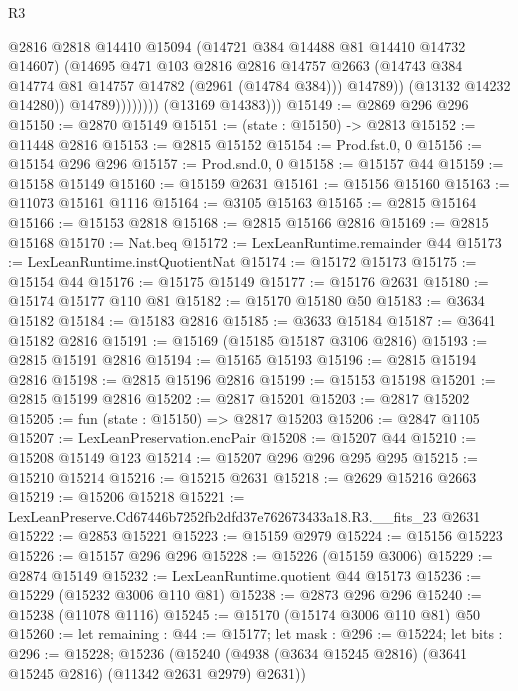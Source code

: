 \begin{lexlean}{R3}
\begin{coremodule}
                            @2816
                            @2818
                            @14410
                            @15094
                            (@14721 @384 @14488 @81 @14410 @14732 @14607)
                            (@14695
                              @471
                              @103
                              @2816
                              @2816
                              @14757
                              @2663
                              (@14743 @384 @14774 @81 @14757 @14782 (@2961 (@14784 @384)))
                              @14789))
                          (@13132 @14232 @14280))
                        @14789))))))))
        (@13169 @14383)))
@15149 := @2869 @296 @296
@15150 := @2870 @15149
@15151 := (state : @15150) -> @2813
@15152 := @11448 @2816
@15153 := @2815 @15152
@15154 := Prod.fst.{0, 0}
@15156 := @15154 @296 @296
@15157 := Prod.snd.{0, 0}
@15158 := @15157 @44
@15159 := @15158 @15149
@15160 := @15159 @2631
@15161 := @15156 @15160
@15163 := @11073 @15161 @1116
@15164 := @3105 @15163
@15165 := @2815 @15164
@15166 := @15153 @2818
@15168 := @2815 @15166 @2816
@15169 := @2815 @15168
@15170 := Nat.beq
@15172 := LexLeanRuntime.remainder @44
@15173 := LexLeanRuntime.instQuotientNat
@15174 := @15172 @15173
@15175 := @15154 @44
@15176 := @15175 @15149
@15177 := @15176 @2631
@15180 := @15174 @15177 @110 @81
@15182 := @15170 @15180 @50
@15183 := @3634 @15182
@15184 := @15183 @2816
@15185 := @3633 @15184
@15187 := @3641 @15182 @2816
@15191 := @15169 (@15185 @15187 @3106 @2816)
@15193 := @2815 @15191 @2816
@15194 := @15165 @15193
@15196 := @2815 @15194 @2816
@15198 := @2815 @15196 @2816
@15199 := @15153 @15198
@15201 := @2815 @15199 @2816
@15202 := @2817 @15201
@15203 := @2817 @15202
@15205 := fun (state : @15150) => @2817 @15203
@15206 := @2847 @1105
@15207 := LexLeanPreservation.encPair
@15208 := @15207 @44
@15210 := @15208 @15149 @123
@15214 := @15207 @296 @296 @295 @295
@15215 := @15210 @15214
@15216 := @15215 @2631
@15218 := @2629 @15216 @2663
@15219 := @15206 @15218
@15221 := LexLeanPreserve.Cd67446b7252fb2dfd37e762673433a18.R3.__fits_23 @2631
@15222 := @2853 @15221
@15223 := @15159 @2979
@15224 := @15156 @15223
@15226 := @15157 @296 @296
@15228 := @15226 (@15159 @3006)
@15229 := @2874 @15149
@15232 := LexLeanRuntime.quotient @44 @15173
@15236 := @15229 (@15232 @3006 @110 @81)
@15238 := @2873 @296 @296
@15240 := @15238 (@11078 @1116)
@15245 := @15170 (@15174 @3006 @110 @81) @50
@15260 := let remaining : @44 := @15177;
  let mask : @296 := @15224;
  let bits : @296 := @15228;
  @15236 (@15240 (@4938 (@3634 @15245 @2816) (@3641 @15245 @2816) (@11342 @2631 @2979) @2631))

\end{coremodule}
\end{lexlean}
